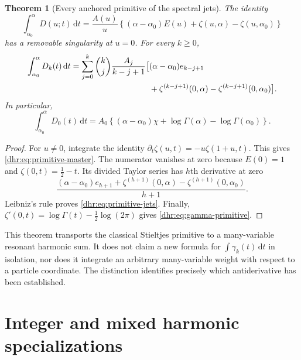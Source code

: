 \documentclass[11pt,letterpaper]{article}
\numberwithin{equation}{section}
\newtheorem{theorem}{Theorem}[section]
\theoremstyle{definition}\newtheorem{definition}[theorem]{Definition}
\theoremstyle{remark}\newtheorem{remark}[theorem]{Remark}
\newcommand{\diff}{\,\mathrm d}
\begin{document}
\begin{theorem}[Every anchored primitive of the spectral jets]
\label{dhr:thm:primitive}
The identity
\begin{equation}\label{dhr:eq:primitive-master}
 \int_{\alpha_0}^{\alpha}D(u;t)\diff t
 =\frac{A(u)}u\left\{(\alpha-\alpha_0)E(u)
                  +\zeta(u,\alpha)-\zeta(u,\alpha_0)\right\}
\end{equation}
has a removable singularity at $u=0$. For every $k\geq0$,
\begin{align}
 \int_{\alpha_0}^{\alpha}D_k(t)\diff t
 =\sum_{j=0}^k\binom{k}{j}\frac{A_j}{k-j+1}
 \big[& (\alpha-\alpha_0)e_{k-j+1}\notag\\
 &+\zeta^{(k-j+1)}(0,\alpha)
 -\zeta^{(k-j+1)}(0,\alpha_0)\big].
 \label{dhr:eq:primitive-jets}
\end{align}
In particular,
\begin{equation}\label{dhr:eq:gamma-primitive}
 \int_{\alpha_0}^{\alpha}D_0(t)\diff t
 =A_0\left\{(\alpha-\alpha_0)\chi
       +\log\Gamma(\alpha)-\log\Gamma(\alpha_0)\right\}.
\end{equation}
\end{theorem}
\begin{proof}
For $u\ne0$, integrate the identity
$\partial_t\zeta(u,t)=-u\zeta(1+u,t)$.
This gives \eqref{dhr:eq:primitive-master}. The numerator vanishes
at zero because $E(0)=1$ and $\zeta(0,t)=\tfrac12-t$.
Its divided Taylor series has $h$th derivative at zero
\[
 \frac{(\alpha-\alpha_0)e_{h+1}
       +\zeta^{(h+1)}(0,\alpha)-\zeta^{(h+1)}(0,\alpha_0)}{h+1}.
\]
Leibniz's rule proves \eqref{dhr:eq:primitive-jets}. Finally,
$\zeta'(0,t)=\log\Gamma(t)-\tfrac12\log(2\pi)$
\cite{dlmf:hurwitz} gives \eqref{dhr:eq:gamma-primitive}.
\end{proof}

This theorem transports the classical Stieltjes primitive to a
many-variable resonant harmonic sum. It does not claim a new formula
for $\int\gamma_k(t)\diff t$ in isolation, nor does it integrate an
arbitrary many-variable weight with respect to a particle coordinate.
The distinction identifies precisely which antiderivative has been
established.


\section{Integer and mixed harmonic specializations}
\label{dhr:sec:harmonic}
\end{document}
